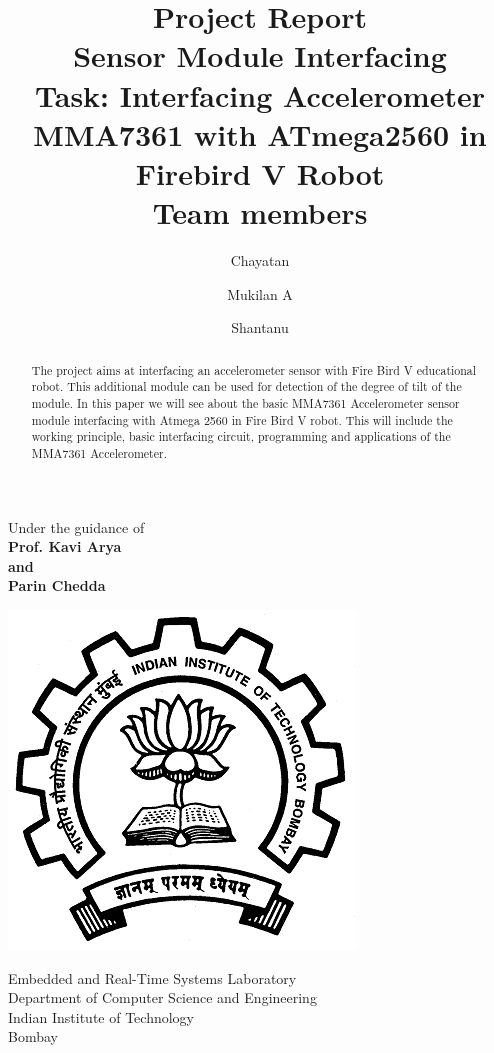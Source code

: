 \documentclass[a4paper,12 pt]{article}
\title {Project Report \\ Sensor Module Interfacing \\[10pt] Task:
Interfacing Accelerometer MMA7361 with ATmega2560 in Firebird V Robot \\[25pt] Team members }
\author {Chayatan \and Mukilan A \and Shantanu}
\begin{document}
\maketitle
\begin{center}
\begin{large}
Under the guidance of\\
\textbf{Prof. Kavi Arya\\and\\Parin Chedda}\\
\vspace{0.5in}
\end{large}
\end{center}
\begin{center}
\includegraphics[scale=0.32]{iitb.png}
\end{center}
\begin{center}
\begin{large}
Embedded and Real-Time Systems Laboratory \\
Department of Computer Science and Engineering \\
Indian Institute of Technology \\
Bombay \\
\end{large}
\end{center}

\newpage
\tableofcontents
\newpage

\begin{abstract}
The project aims at interfacing an accelerometer sensor with Fire Bird
V educational robot. This additional module can be used for detection
of the degree of tilt of the module. In this
paper we will see about the basic  MMA7361 Accelerometer sensor
module interfacing with Atmega 2560 in Fire Bird V robot. This will
include the working principle, basic interfacing circuit, programming and
applications of the MMA7361 Accelerometer.
\end{abstract}
\end{document}
